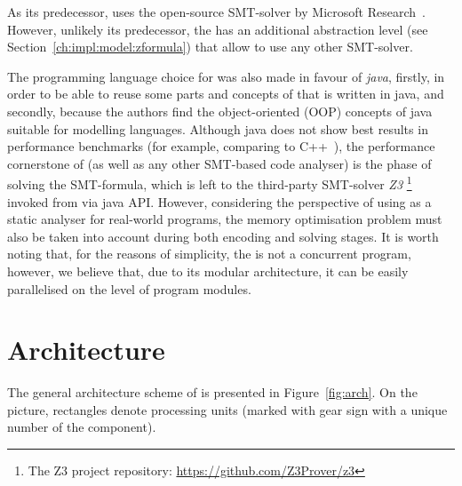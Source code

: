 As its predecessor, \porthos[2] uses the open-source SMT-solver  by Microsoft Research~\cite{de2008z3}. However, unlikely its predecessor, the \porthos[2] has an additional abstraction level \zformula{} (see Section~\ref{ch:impl:model:zformula}) that allow to use any other SMT-solver. %

The programming language choice for \porthos[2] was also made in favour of \textit{java}, firstly, in order to be able to reuse some parts and concepts of \porthos[1] that is written in java, and secondly, because the authors find the object-oriented (OOP) concepts of java suitable for modelling languages.
Although java does not show best results in performance benchmarks (for example, comparing to C++~\cite{hundt2011loop, oaks2014java}), the performance cornerstone of \porthos[2] (as well as any other SMT-based code analyser) is the phase of solving the SMT-formula, which is left to the third-party SMT-solver \textit{Z3}%
\footnote{The Z3 project repository: \url{https://github.com/Z3Prover/z3}} %
invoked from \porthos[2] via java API.
However, considering the perspective of using \porthos[2] as a static analyser for real-world programs, the memory optimisation problem must also be taken into account during both encoding and solving stages.
It is worth noting that, for the reasons of simplicity, the \porthos[2] is not a concurrent program, however, we believe that, due to its modular architecture, it can be easily parallelised on the level of program modules.


\section{Architecture}
\label{ch:impl:arch}

The general architecture scheme of \porthos[2] is presented in Figure~\ref{fig:arch}. On the picture, rectangles denote processing units (marked with gear sign with a unique number of the component).

